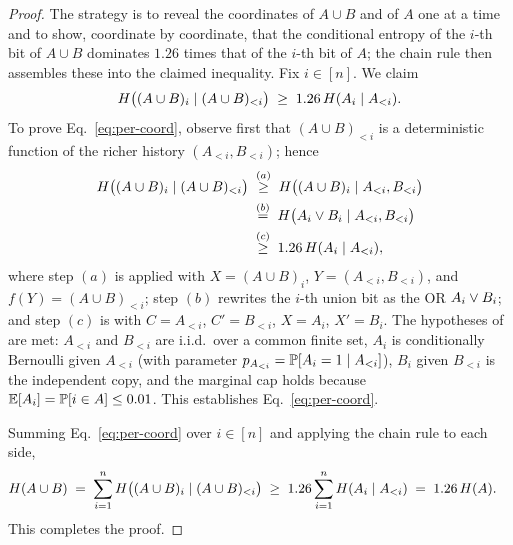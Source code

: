 \begin{proof}
The strategy is to reveal the coordinates of $A \cup B$ and of $A$ one at a time
and to show, coordinate by coordinate, that the conditional entropy of the
$i$-th bit of $A \cup B$ dominates $1.26$ times that of the $i$-th bit of $A$;
the chain rule then assembles these into the claimed inequality. Fix $i \in [n]$.
We claim
\begin{align}
H\bigl((A \cup B)_i \mid (A \cup B)_{<i}\bigr)
\;\ge\; 1.26\,H(A_i \mid A_{<i}). \label{eq:per-coord}
\end{align}
To prove Eq.~\eqref{eq:per-coord}, observe first that $(A \cup B)_{<i}$ is a
deterministic function of the richer history $(A_{<i}, B_{<i})$; hence
\begin{align}
H\bigl((A \cup B)_i \mid (A \cup B)_{<i}\bigr)
&\;\overset{(a)}{\ge}\; H\bigl((A \cup B)_i \mid A_{<i}, B_{<i}\bigr) \label{eq:coarsen-step} \\
&\;\overset{(b)}{=}\; H\bigl(A_i \vee B_i \mid A_{<i}, B_{<i}\bigr) \notag \\
&\;\overset{(c)}{\ge}\; 1.26\,H(A_i \mid A_{<i}), \notag
\end{align}
where step $(a)$ is  applied with $X = (A \cup B)_i$,
$Y = (A_{<i}, B_{<i})$, and $f(Y) = (A \cup B)_{<i}$; step $(b)$ rewrites the
$i$-th union bit as the OR $A_i \vee B_i$; and step $(c)$ is
 with $C = A_{<i}$, $C' = B_{<i}$, $X = A_i$, $X' = B_i$.
The hypotheses of  are met: $A_{<i}$ and $B_{<i}$ are i.i.d.\
over a common finite set, $A_i$ is conditionally $\mathrm{Bernoulli}$ given
$A_{<i}$ (with parameter $p_{A_{<i}} = \mathbb{P}[A_i = 1 \mid A_{<i}]$), $B_i$ given
$B_{<i}$ is the independent copy, and the marginal cap holds because
$\mathbb{E}[A_i] = \mathbb{P}[i \in A] \le 0.01$. This establishes Eq.~\eqref{eq:per-coord}.

Summing Eq.~\eqref{eq:per-coord} over $i \in [n]$ and applying the chain rule
\Cref{fac:chain-rule} to each side,
\begin{align*}
H(A \cup B)
&\;=\; \sum_{i=1}^{n} H\bigl((A \cup B)_i \mid (A \cup B)_{<i}\bigr)
\;\ge\; 1.26 \sum_{i=1}^{n} H(A_i \mid A_{<i})
\;=\; 1.26\,H(A).
\end{align*}
This completes the proof.
\end{proof}
